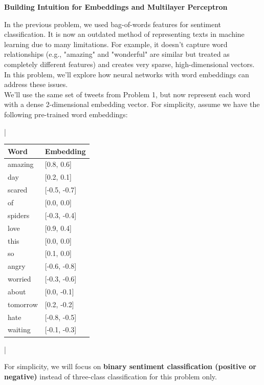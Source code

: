 \item {\bf Building Intuition for Embeddings and Multilayer Perceptron}

In the previous problem, we used bag-of-words features for sentiment classification. It is now an outdated method of representing texts in machine learning due to many limitations. For example, it doesn't capture word relationships (e.g., "amazing" and "wonderful" are similar but treated as completely different features) and creates very sparse, high-dimensional vectors. In this problem, we'll explore how neural networks with word embeddings can address these issues.\\

We'll use the same set of tweets from Problem 1, but now represent each word with a dense 2-dimensional embedding vector. For simplicity, assume we have the following pre-trained word embeddings:

\begin{table}[h]
\centering
\lstDeleteShortInline|
\begin{tabular}{|l|l|}
\hline
Word & Embedding \\
\hline
amazing & [0.8, 0.6] \\
day & [0.2, 0.1] \\
scared & [-0.5, -0.7] \\
of & [0.0, 0.0] \\
spiders & [-0.3, -0.4] \\
love & [0.9, 0.4] \\
this & [0.0, 0.0] \\
so & [0.1, 0.0] \\
angry & [-0.6, -0.8] \\
worried & [-0.3, -0.6] \\
about & [0.0, -0.1] \\
tomorrow & [0.2, -0.2] \\
hate & [-0.8, -0.5] \\
waiting & [-0.1, -0.3] \\
\hline
\end{tabular}
\lstMakeShortInline|
\end{table}

For simplicity, we will focus on \textbf{binary sentiment classification (positive or negative)} instead of three-class classification for this problem only.

\begin{enumerate}

  

  

  

  

\end{enumerate}
